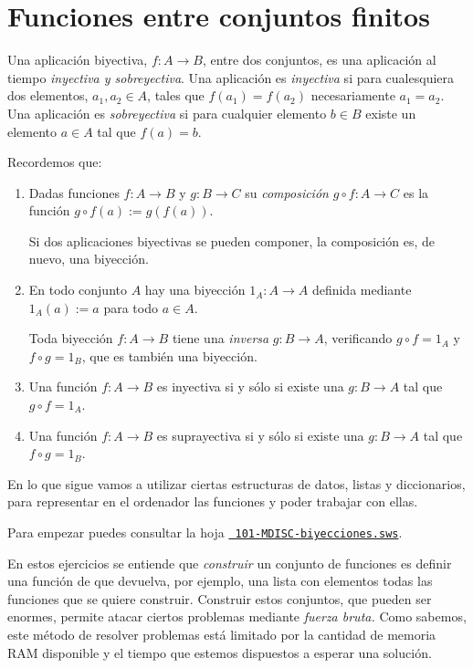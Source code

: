 \section{Funciones entre conjuntos finitos}

Una aplicaci\'on biyectiva, $f:A\longrightarrow B$, entre dos conjuntos, es una
aplicaci\'on al tiempo {\itshape inyectiva y sobreyectiva}. Una aplicaci\'on es
{\itshape inyectiva} si para cualesquiera dos elementos,  $a_1,a_2\in A$, tales
que  $f(a_1)=f(a_2)$ necesariamente $a_1=a_2$. Una aplicaci\'on es {\itshape
sobreyectiva} si para cualquier elemento $b\in B$ existe un elemento $a\in A$
tal que $f(a)=b$. 
 
Recordemos que:
\begin{enumerate}
\item Dadas funciones  $f:A\longrightarrow B$ y $g:B\longrightarrow C$ su
{\itshape composici\'on} $g\circ f:A  \longrightarrow C$ es la funci\'on
$g\circ f(a):=g(f(a)).$

Si dos aplicaciones biyectivas se pueden componer, la composici\'on es, de
nuevo, una biyecci\'on. 

\item En todo conjunto $A$ hay una biyecci\'on $1_A:A\longrightarrow A$ definida
mediante $1_A(a):=a$ para todo $a\in A.$

Toda biyecci\'on $f:A\longrightarrow B$ tiene una {\itshape inversa}
$g:B\longrightarrow A$, verificando $g\circ f=1_A$ y  $f\circ g=1_B$, que es
también una biyecci\'on.

\item Una funci\'on $f:A\longrightarrow B$ es inyectiva si y s\'olo si existe
una $g:B\longrightarrow A$ tal que $g\circ f=1_A$.

\item Una funci\'on $f:A\longrightarrow B$ es suprayectiva si y s\'olo si existe
una $g:B\longrightarrow A$ tal que $f\circ g=1_B$.
\end{enumerate}


En lo que sigue vamos a utilizar
ciertas estructuras de datos, listas y diccionarios, para representar
en el ordenador las funciones y poder trabajar con ellas. 

Para empezar puedes consultar la hoja
\href{http://sage.mat.uam.es:8888/home/pub/?/}{\tt
101-MDISC-biyecciones.sws}.

En estos ejercicios se entiende que {\itshape construir} un conjunto de funciones es definir
una funci\'on de {\sage} que devuelva, por ejemplo, una lista con elementos 
todas las funciones que se quiere construir. Construir estos conjuntos, que 
pueden ser enormes, permite atacar ciertos problemas mediante {\itshape fuerza 
bruta.} Como sabemos,  este m\'etodo de resolver problemas est\'a limitado por 
la cantidad de memoria RAM disponible y el tiempo que estemos dispuestos a 
esperar una soluci\'on.

